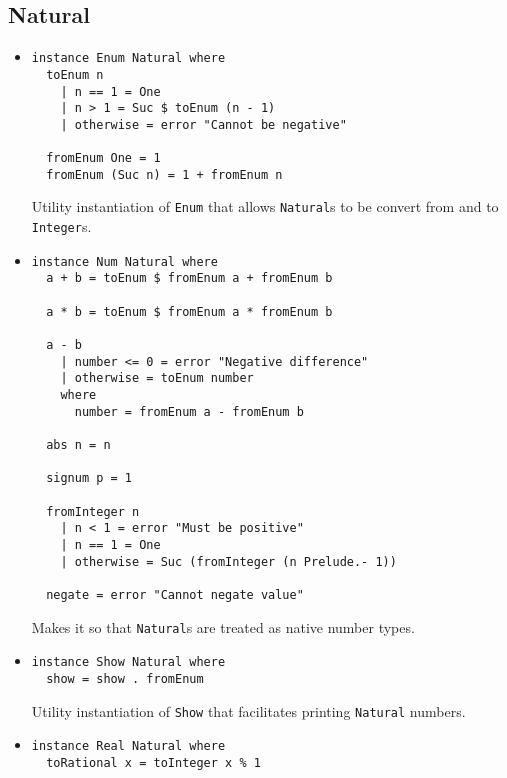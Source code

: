 \documentclass[11pt,a4paper]{article}
\begin{document}
\subsection{Natural}

\begin{itemize}
    \item \begin{lstlisting}
instance Enum Natural where
  toEnum n
    | n == 1 = One
    | n > 1 = Suc $ toEnum (n - 1)
    | otherwise = error "Cannot be negative"

  fromEnum One = 1
  fromEnum (Suc n) = 1 + fromEnum n
    \end{lstlisting}

          Utility instantiation of \lstinline{Enum} that allows \lstinline{Natural}s to be convert from and to \lstinline{Integer}s.

    \item \begin{lstlisting}
instance Num Natural where
  a + b = toEnum $ fromEnum a + fromEnum b

  a * b = toEnum $ fromEnum a * fromEnum b

  a - b
    | number <= 0 = error "Negative difference"
    | otherwise = toEnum number
    where
      number = fromEnum a - fromEnum b

  abs n = n

  signum p = 1

  fromInteger n
    | n < 1 = error "Must be positive"
    | n == 1 = One
    | otherwise = Suc (fromInteger (n Prelude.- 1))

  negate = error "Cannot negate value"
    \end{lstlisting}

          Makes it so that \lstinline{Natural}s are treated as native number types.

    \item \begin{lstlisting}
instance Show Natural where
  show = show . fromEnum
    \end{lstlisting}

          Utility instantiation of \lstinline{Show} that facilitates printing \lstinline{Natural} numbers.

    \item \begin{lstlisting}
instance Real Natural where
  toRational x = toInteger x % 1
    \end{lstlisting}


\end{itemize}
\end{document}
